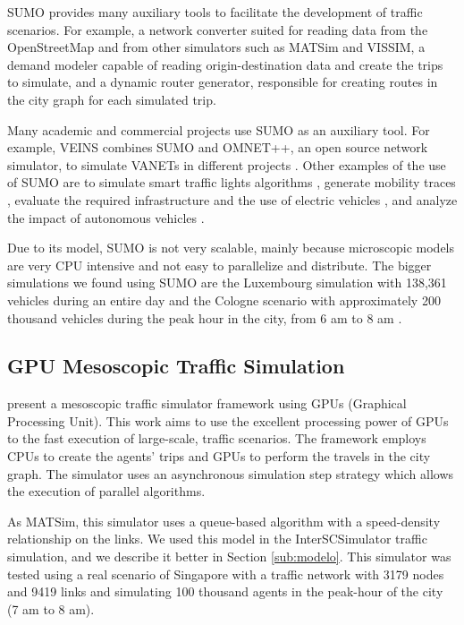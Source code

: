 SUMO provides many auxiliary tools to facilitate the development of traffic scenarios. For example, a network converter suited for reading data from the OpenStreetMap and from other simulators such as MATSim and VISSIM, a demand modeler capable of reading origin-destination data and create the trips to simulate, and a dynamic router generator, responsible for creating routes in the city graph for each simulated trip. 

Many academic and commercial projects use SUMO as an auxiliary tool. For example, VEINS  \citep{riebl2015artery} combines SUMO and OMNET++, an open source network simulator, to simulate VANETs in different projects \citep{buse2018bridging,aslam2018flexible}. Other examples of the use of SUMO are to simulate smart traffic lights algorithms \citep{azevedo2016jade}, generate mobility traces \citep{codeca2017luxembourg,uppoor2014generation}, evaluate the required infrastructure and the use of electric vehicles \citep{sagaama2018proposal}, and analyze the impact of autonomous vehicles \citep{tettamanti2018vehicle,garzon2018hybrid}.

Due to its model, SUMO is not very scalable, mainly because microscopic models are very CPU intensive and not easy to parallelize and distribute. The bigger simulations we found using SUMO are the Luxembourg simulation with 138,361 vehicles during an entire day \citep{codeca2017luxembourg} and the Cologne scenario with approximately 200 thousand vehicles during the peak hour in the city, from 6 am to 8 am \citep{uppoor2014generation}.

\subsection{GPU Mesoscopic Traffic Simulation}

\citep{song2017gpusimulation} present a mesoscopic traffic simulator framework using GPUs (Graphical Processing Unit). This work aims to use the excellent processing power of GPUs to the fast execution of large-scale, traffic scenarios. The framework employs CPUs to create the agents' trips and GPUs to perform the travels in the city graph. The simulator uses an asynchronous simulation step strategy which allows the execution of parallel algorithms.

As MATSim, this simulator uses a queue-based algorithm with a speed-density relationship on the links. We used this model in the InterSCSimulator traffic simulation, and we describe it better in Section \ref{sub:modelo}. This simulator was tested using a real scenario of Singapore with a traffic network with 3179 nodes and 9419 links and simulating 100 thousand agents in the peak-hour of the city (7 am to 8 am).

